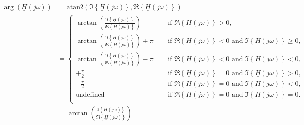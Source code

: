 \begin{solution}
\begin{tasks}
		\task
		\begin{equation*}
			\begin{split}
				\arg\left(\underline{H}\left(j \omega\right)\right) &= \mathrm{atan2}\left(\Im\left\{\underline{H}\left(j \omega\right)\right\}, \Re\left\{\underline{H}\left(j \omega\right)\right\}\right) \\
				 &= \begin{cases}
				 	\arctan\left(\frac{\Im\left\{\underline{H}\left(j \omega\right)\right\}}{\Re\left\{\underline{H}\left(j \omega\right)\right\}}\right) &\quad \text{ if } \Re\left\{\underline{H}\left(j \omega\right)\right\} > 0, \\
				 	\arctan\left(\frac{\Im\left\{\underline{H}\left(j \omega\right)\right\}}{\Re\left\{\underline{H}\left(j \omega\right)\right\}}\right) + \pi &\quad \text{ if } \Re\left\{\underline{H}\left(j \omega\right)\right\} < 0 \text{ and } \Im\left\{\underline{H}\left(j \omega\right)\right\} \geq 0, \\
				 	\arctan\left(\frac{\Im\left\{\underline{H}\left(j \omega\right)\right\}}{\Re\left\{\underline{H}\left(j \omega\right)\right\}}\right) - \pi &\quad \text{ if } \Re\left\{\underline{H}\left(j \omega\right)\right\} < 0 \text{ and } \Im\left\{\underline{H}\left(j \omega\right)\right\} < 0, \\
				 	+\frac{\pi}{2} &\quad \text{ if } \Re\left\{\underline{H}\left(j \omega\right)\right\} = 0 \text{ and } \Im\left\{\underline{H}\left(j \omega\right)\right\} > 0, \\
				 	-\frac{\pi}{2} &\quad \text{ if } \Re\left\{\underline{H}\left(j \omega\right)\right\} = 0 \text{ and } \Im\left\{\underline{H}\left(j \omega\right)\right\} < 0, \\
				 	\text{undefined} &\quad \text{ if } \Re\left\{\underline{H}\left(j \omega\right)\right\} = 0 \text{ and } \Im\left\{\underline{H}\left(j \omega\right)\right\} = 0. \\
				 \end{cases} \\
				 &= \arctan\left(\frac{\Im\left\{\underline{H}\left(j \omega\right)\right\}}{\Re\left\{\underline{H}\left(j \omega\right)\right\}}\right)
			\end{split}
		\end{equation*}
		

\end{tasks}
\end{solution}
